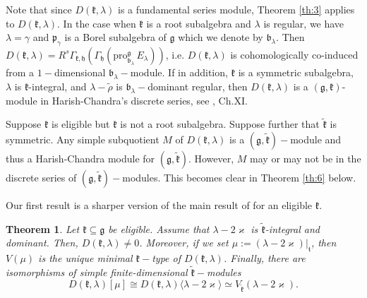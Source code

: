 \documentclass[default]{./styles/svmult}
\newtheorem{theo}{Theorem}[section]
\newcommand{\pro}{\mathrm{pro}}
\newcommand{\bb}{\mathfrak{b}}
\renewcommand{\gg}{\mathfrak{g}}
\newcommand{\hh}{\mathfrak{h}}
\newcommand{\kk}{\mathfrak{k}}
\newcommand{\pp}{\mathfrak{p}}
\renewcommand{\tt}{\mathfrak{t}}
\begin{document}
Note that since $D(\kk,\lambda)$ is a fundamental series module, Theorem \ref{th:3} applies to $D(\kk,\lambda)$. In the case when $\kk$ is a root subalgebra and $\lambda$ is regular, we have $\lambda = \gamma$ and $\pp_{\gamma}$ is a Borel subalgebra of $\gg$ which we denote by $\bb_{\lambda}$. Then $D(\kk,\lambda) = R^s\Gamma_{\kk,\hh}(\Gamma_\hh(\pro^\gg_{\bb_\lambda}\,E_\lambda))$, i.e. $D(\kk,\lambda)$ is cohomologically co-induced from a $1-$dimensional $\bb_{\lambda}-$module. If in addition, $\kk$ is a symmetric subalgebra, $\lambda$ is $\kk$-integral, and $\lambda - \tilde{\rho}$ is $\bb_{\lambda}-$dominant regular, then $D(\kk,\lambda)$ is a $(\gg,\kk)$-module in Harish-Chandra's discrete series, see \cite{KV}, Ch.XI.

Suppose $\kk$ is eligible but $\kk$ is not a root subalgebra. Suppose further that $\tilde{\kk}$ is symmetric. Any simple subquotient $M$ of $D(\kk,\lambda)$ is a $(\gg,\tilde{\kk})-$module and thus a Harish-Chandra module for $(\gg,\tilde{\kk})$. However, $M$ may or may not be in the discrete series of $(\gg,\tilde{\kk})-$modules. This becomes clear in Theorem \ref{th:6} below.

Our first result is a sharper version of the main result of \cite{PZ3} for an eligible $\kk$. %

\begin{theo}\label{th3}
    Let $\kk\subseteq\gg$ be eligible. Assume that $\lambda-2\varkappa$ is $\tilde{\kk}$-integral and dominant. Then, $D(\kk,\lambda) \neq 0$. Moreover, if we set $\mu := (\lambda - 2\varkappa)|_{\tt}$, then $V(\mu)$ is the unique minimal $\kk-$type of $D(\kk,\lambda)$. Finally, there are isomorphisms of simple finite-dimensional $\tilde{\kk}-$modules
$$D(\kk,\lambda)[\mu] \cong D(\kk,\lambda)\langle\lambda - 2\varkappa\rangle \simeq V_{\tilde{\kk}}(\lambda - 2\varkappa).$$

\end{theo}
\end{document}
